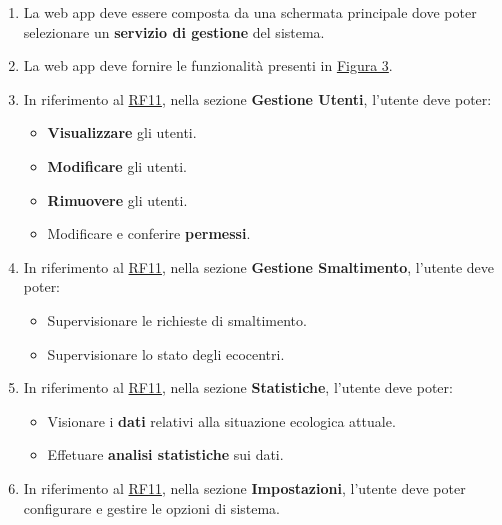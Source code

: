 \begin{enumerate}[start=10,label=\textbf{RF\theenumi}, labelwidth=4em, left=0pt, align=left, itemindent=-0.6em]
    
    \item \label{itm:RF10} La web app deve essere composta da una schermata principale dove poter selezionare un
    \textbf{servizio di gestione} del sistema.
    
    \item \label{itm:RF11} La web app  deve fornire le funzionalità presenti in \hyperref[fig:webapp]{Figura 3}.

    \item \label{itm:RF12}   In riferimento al \hyperref[itm:RF11]{RF11}, nella sezione \textbf{Gestione Utenti}, l'utente deve poter:
    \begin{itemize}[itemindent=-0.6em]
        \item \textbf{Visualizzare }gli utenti.
        \item \textbf{Modificare} gli utenti.
        \item \textbf{Rimuovere} gli utenti.
        \item Modificare e conferire \textbf{permessi}.
    \end{itemize}
    
    \item \label{itm:RF13}   In riferimento al \hyperref[itm:RF11]{RF11}, nella sezione \textbf{{Gestione Smaltimento}}, l'utente deve poter:
    \begin{itemize}[itemindent=-0.6em]
        \item Supervisionare le richieste di smaltimento.
        \item Supervisionare lo stato degli ecocentri.
    \end{itemize}
        
    \item \label{itm:RF14}   In riferimento al \hyperref[itm:RF11]{RF11},  nella sezione \textbf{{Statistiche}}, l'utente deve poter:
    \begin{itemize}[itemindent=-0.6em]
        \item Visionare i \textbf{dati} relativi alla situazione ecologica attuale.
        \item Effetuare \textbf{analisi statistiche} sui dati.
    \end{itemize}

    \item \label{itm:RF15}   In riferimento al \hyperref[itm:RF11]{RF11}, nella sezione \textbf{{Impostazioni}}, l'utente deve poter configurare e gestire le opzioni di sistema.
    
\end{enumerate}


